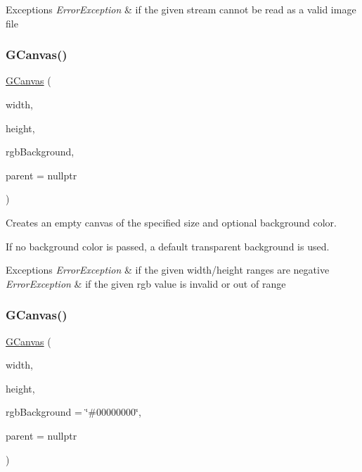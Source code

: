 \begin{DoxyExceptions}{Exceptions}
{\em Error\+Exception} & if the given stream cannot be read as a valid image file \\
\hline
\end{DoxyExceptions}
\mbox{\label{classGCanvas_a235f6b1b700354d6737607562df06581}} 
\subsubsection{\texorpdfstring{G\+Canvas()}{GCanvas()}\hspace{0.1cm}{\footnotesize\ttfamily [4/5]}}
{\footnotesize\ttfamily \mbox{\hyperlink{classGCanvas}{G\+Canvas}} (\begin{DoxyParamCaption}\item[{double}]{width,  }\item[{double}]{height,  }\item[{int}]{rgb\+Background,  }\item[{Q\+Widget $\ast$}]{parent = {\ttfamily nullptr} }\end{DoxyParamCaption})}



Creates an empty canvas of the specified size and optional background color. 

If no background color is passed, a default transparent background is used. 
\begin{DoxyExceptions}{Exceptions}
{\em Error\+Exception} & if the given width/height ranges are negative \\
\hline
{\em Error\+Exception} & if the given rgb value is invalid or out of range \\
\hline
\end{DoxyExceptions}
\mbox{\label{classGCanvas_af8bb8bd29201bbb5d0f90016a1d8df2c}} 
\subsubsection{\texorpdfstring{G\+Canvas()}{GCanvas()}\hspace{0.1cm}{\footnotesize\ttfamily [5/5]}}
{\footnotesize\ttfamily \mbox{\hyperlink{classGCanvas}{G\+Canvas}} (\begin{DoxyParamCaption}\item[{double}]{width,  }\item[{double}]{height,  }\item[{const std\+::string \&}]{rgb\+Background = {\ttfamily \char`\"{}\#00000000\char`\"{}},  }\item[{Q\+Widget $\ast$}]{parent = {\ttfamily nullptr} }\end{DoxyParamCaption})}



